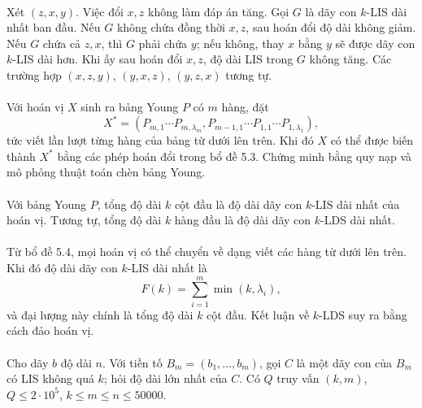 \documentclass[11pt]{article}
\begin{document}
\paragraph{}
Xét \((z,x,y)\). Việc đổi \(x,z\) không làm đáp án tăng. Gọi \(G\) là dãy con
\(k\)-LIS dài nhất ban đầu. Nếu \(G\) không chứa đồng thời \(x,z\), sau hoán
đổi độ dài không giảm. Nếu \(G\) chứa cả \(z,x\), thì \(G\) phải chứa \(y\);
nếu không, thay \(x\) bằng \(y\) sẽ được dãy con \(k\)-LIS dài hơn. Khi ấy
sau hoán đổi \(x,z\), độ dài LIS trong \(G\) không tăng. Các trường hợp
\((x,z,y)\), \((y,x,z)\), \((y,z,x)\) tương tự.

\paragraph{}
Với hoán vị \(X\) sinh ra bảng Young \(P\) có \(m\) hàng, đặt
\[
X^*=(P_{m,1}\cdots P_{m,\lambda_m},
P_{m-1,1}\cdots P_{1,1}\cdots P_{1,\lambda_1}),
\]
tức viết lần lượt từng hàng của bảng từ dưới lên trên. Khi đó \(X\) có thể
được biến thành \(X^*\) bằng các phép hoán đổi trong bổ đề 5.3. Chứng minh
bằng quy nạp và mô phỏng thuật toán chèn bảng Young.

\paragraph{}
Với bảng Young \(P\), tổng độ dài \(k\) cột đầu là độ dài dãy con \(k\)-LIS
dài nhất của hoán vị. Tương tự, tổng độ dài \(k\) hàng đầu là độ dài dãy con
\(k\)-LDS dài nhất.

\paragraph{}
Từ bổ đề 5.4, mọi hoán vị có thể chuyển về dạng viết các hàng từ dưới lên
trên. Khi đó độ dài dãy con \(k\)-LIS dài nhất là
\[
F(k)=\sum_{i=1}^m \min(k,\lambda_i),
\]
và đại lượng này chính là tổng độ dài \(k\) cột đầu. Kết luận về \(k\)-LDS
suy ra bằng cách đảo hoán vị.

\paragraph{}
Cho dãy \(b\) độ dài \(n\). Với tiền tố \(B_m=(b_1,\ldots,b_m)\), gọi \(C\)
là một dãy con của \(B_m\) có LIS không quá \(k\); hỏi độ dài lớn nhất của
\(C\). Có \(Q\) truy vấn \((k,m)\), \(Q\le2\cdot10^5\),
\(k\le m\le n\le50000\).
\end{document}
